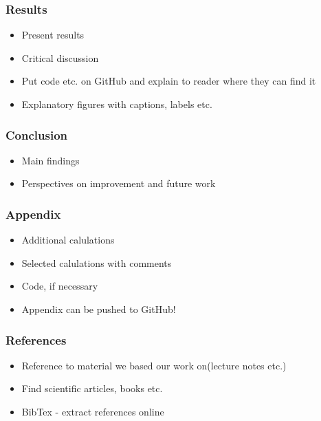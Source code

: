 \documentclass[12pt]{article}
\begin{document}
\subsubsection*{Results}

\begin{itemize}
\item Present results
\item Critical discussion
\item Put code etc. on GitHub and explain to reader where they can find it
\item Explanatory figures with captions, labels etc.
\end{itemize}

\subsubsection*{Conclusion}

\begin{itemize}
\item Main findings
\item Perspectives on improvement and future work
\end{itemize}

\subsubsection*{Appendix}

\begin{itemize}
\item Additional calulations
\item Selected calulations with comments
\item Code, if necessary
\item Appendix can be pushed to GitHub!
\end{itemize}

\subsubsection*{References}

\begin{itemize}
\item Reference to material we based our work on(lecture notes etc.)
\item Find scientific articles, books etc.
\item BibTex - extract references online
\end{itemize}
\end{document}
